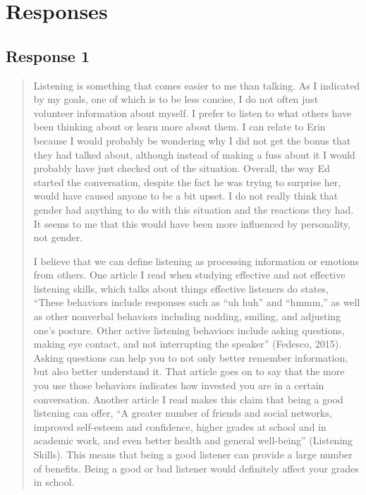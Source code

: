 
\section{Responses}
  \subsection{Response 1}
    \begin{quotation}
      Listening is something that comes easier to me than talking.
        As I indicated by my goals, one of which is to be less concise, I do not
        often just volunteer information about myself.  I prefer to listen to
        what others have been thinking about or learn more about them. I can
        relate to Erin because I would probably be wondering why I did not get
        the bonus that they had talked about, although instead of making a fuss
        about it I would probably have just checked out of the situation.
        Overall, the way Ed started the conversation, despite the fact he was
        trying to surprise her, would have caused anyone to be a bit upset.
        I do not really think that gender had anything to do with this situation
        and the reactions they had. It seems to me that this would have been
        more influenced by personality, not gender.

      I believe that we can define listening as processing information or
        emotions from others.  One article I read when studying effective and
        not effective listening skills, which talks about things effective
        listeners do states, “These behaviors include responses such as
        ``uh huh'' and ``hmmm,'' as well as other nonverbal behaviors including
        nodding, smiling, and adjusting one's posture. Other active listening
        behaviors include asking questions, making eye contact, and not
        interrupting the speaker” (Fedesco, 2015).  Asking questions can help
        you to not only better remember information, but also better understand
        it. That article goes on to say that the more you use those behaviors
        indicates how invested you are in a certain conversation. Another
        article I read makes this claim that being a good listening can offer,
        ``A greater number of friends and social networks, improved self-esteem
        and confidence, higher grades at school and in academic work, and even
        better health and general well-being'' (Listening Skills). This means
        that being a good listener can provide a large number of benefits. Being
        a good or bad listener would definitely affect your grades in school.


\end{quotation}
